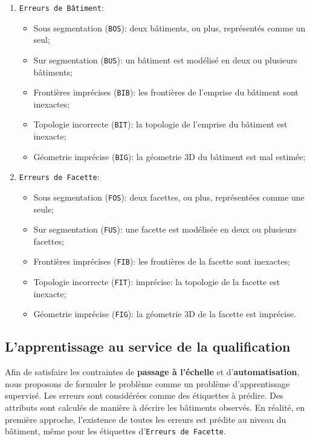        \begin{enumerate}
            \item \texttt{Erreurs de Bâtiment}:
            \begin{itemize}
                \item Sous segmentation (\texttt{BOS}): deux bâtiments, ou plus, représentés comme un seul;
                \item Sur segmentation (\texttt{BUS}): un bâtiment est modélisé en deux ou plusieurs bâtiments;
                \item Frontières imprécises (\texttt{BIB}): les frontières de l'emprise du bâtiment sont inexactes;
                \item Topologie incorrecte (\texttt{BIT}): la topologie de l'emprise du bâtiment est inexacte;
                \item Géometrie imprécise (\texttt{BIG}): la géometrie 3D du bâtiment est mal estimée;
            \end{itemize}
            \item \texttt{Erreurs de Facette}:
            \begin{itemize}
                \item Sous segmentation (\texttt{FOS}): deux facettes, ou plus, représentées comme une seule;
                \item Sur segmentation (\texttt{FUS}): une facette est modélisée en deux ou plusieurs facettes;
                \item Frontières imprécises (\texttt{FIB}): les frontières de la facette sont inexactes;
                \item Topologie incorrecte (\texttt{FIT}): imprécise: la topologie de la facette est inexacte;
                \item Géometrie imprécise (\texttt{FIG}): la géometrie 3D de la facette est imprécise.
            \end{itemize}
        \end{enumerate}

    \subsection*{L'apprentissage au service de la qualification}
        Afin de satisfaire les contraintes de \textbf{passage à l'échelle} et d'\textbf{automatisation}, nous proposons de formuler le problème comme un problème d'apprentissage supervisé.
        Les erreurs sont considérées comme des étiquettes à prédire.
        Des attributs sont calculés de manière à décrire les bâtiments observés.
        En réalité, en première approche, l'existence de toutes les erreurs est prédite au niveau du bâtiment, même pour les étiquettes d'\texttt{Erreurs de Facette}.\\
        
